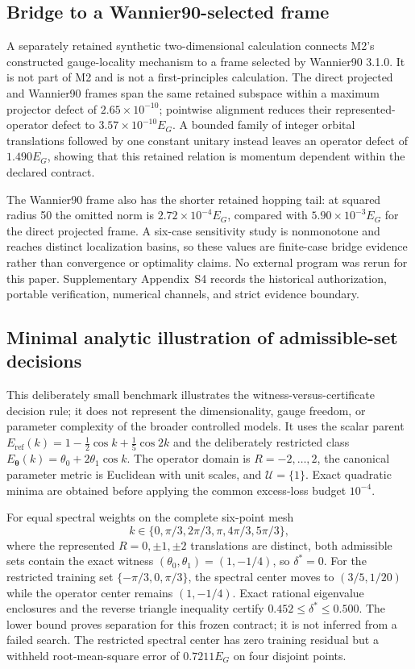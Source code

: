 \documentclass[preprint,12pt]{elsarticle}
\begin{document}
\subsection{Bridge to a Wannier90-selected frame}
\label{sec:wannier90-bridge}

A separately retained synthetic two-dimensional calculation connects M2's
constructed gauge-locality mechanism to a frame selected by Wannier90 3.1.0.
It is not part of M2 and is not a first-principles calculation. The direct
projected and Wannier90 frames span the same retained subspace within a maximum
projector defect of $2.65\times10^{-10}$; pointwise alignment reduces their
represented-operator defect to $3.57\times10^{-10}E_G$. A bounded family of
integer orbital translations followed by one constant unitary instead leaves
an operator defect of $1.490E_G$, showing that this retained relation is
momentum dependent within the declared contract.

The Wannier90 frame also has the shorter retained hopping tail: at squared
radius 50 the omitted norm is $2.72\times10^{-4}E_G$, compared with
$5.90\times10^{-3}E_G$ for the direct projected frame. A six-case sensitivity
study is nonmonotone and reaches distinct localization basins, so these values
are finite-case bridge evidence rather than convergence or optimality claims.
No external program was rerun for this paper. Supplementary Appendix~S4 records
the historical authorization, portable verification, numerical channels, and
strict evidence boundary.

\subsection{Minimal analytic illustration of admissible-set decisions}
\label{sec:direct-admissible-sets}

This deliberately small benchmark illustrates the witness-versus-certificate
decision rule; it does not represent the dimensionality, gauge freedom, or
parameter complexity of the broader controlled models. It uses the scalar parent
$E_{\mathrm{ref}}(k)=1-\tfrac12\cos k+\tfrac15\cos 2k$ and the deliberately
restricted class
$E_{\bm{\theta}}(k)=\theta_0+2\theta_1\cos k$. The operator domain is
$R=-2,\ldots,2$, the canonical parameter metric is Euclidean with unit scales,
and $\mathcal{U}=\{1\}$. Exact quadratic minima are obtained before applying
the common excess-loss budget $10^{-4}$.

For equal spectral weights on the complete six-point mesh
\[
 k\in\{0,\pi/3,2\pi/3,\pi,4\pi/3,5\pi/3\},
\]
where the represented $R=0,\pm1,\pm2$ translations are distinct,
both admissible sets contain the exact witness
$(\theta_0,\theta_1)=(1,-1/4)$, so $\delta^\ast=0$. For the restricted training
set $\{-\pi/3,0,\pi/3\}$, the spectral center moves to $(3/5,1/20)$ while the
operator center remains $(1,-1/4)$. Exact rational eigenvalue enclosures and
the reverse triangle inequality certify
$0.452\leq\delta^\ast\leq0.500$. The lower bound proves separation for this
frozen contract; it is not inferred from a failed search. The restricted
spectral center has zero training residual but a withheld root-mean-square
error of $0.7211E_G$ on four disjoint points.
\end{document}
